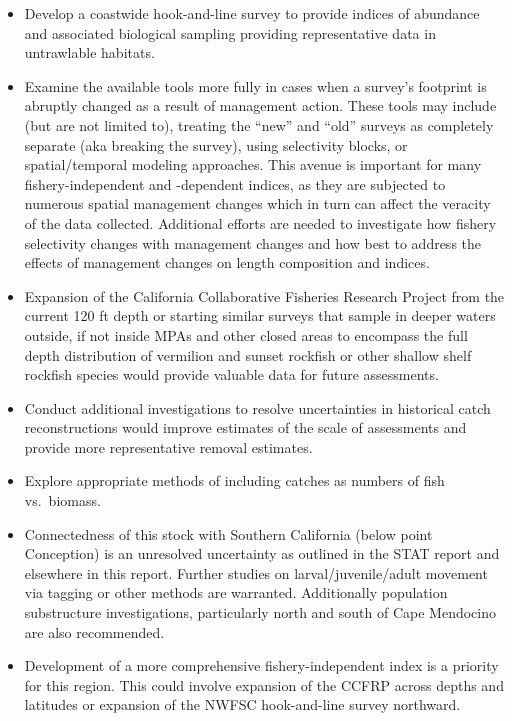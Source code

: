 \documentclass[
  english,
  a4paper,
]{article}
\begin{document}
\begin{itemize}
\item
  Develop a coastwide hook-and-line survey to provide indices of abundance and associated biological sampling providing representative data in untrawlable habitats.
\item
  Examine the available tools more fully in cases when a survey's footprint is abruptly changed as a result of management action. These tools may include (but are not limited to), treating the ``new'' and ``old'' surveys as completely separate (aka breaking the survey), using selectivity blocks, or spatial/temporal modeling approaches. This avenue is important for many fishery-independent and -dependent indices, as they are subjected to numerous spatial management changes which in turn can affect the veracity of the data collected. Additional efforts are needed to investigate how fishery selectivity changes with management changes and how best to address the effects of management changes on length composition and indices.
\item
  Expansion of the California Collaborative Fisheries Research Project from the current 120 ft depth or starting similar surveys that sample in deeper waters outside, if not inside MPAs and other closed areas to encompass the full depth distribution of vermilion and sunset rockfish or other shallow shelf rockfish species would provide valuable data for future assessments.
\item
  Conduct additional investigations to resolve uncertainties in historical catch reconstructions would improve estimates of the scale of assessments and provide more representative removal estimates.
\item
  Explore appropriate methods of including catches as numbers of fish vs.~biomass.
\item
  Connectedness of this stock with Southern California (below point Conception) is an unresolved uncertainty as outlined in the STAT report and elsewhere in this report. Further studies on larval/juvenile/adult movement via tagging or other methods are warranted. Additionally population substructure investigations, particularly north and south of Cape Mendocino are also recommended.
\item
  Development of a more comprehensive fishery-independent index is a priority for this region. This could involve expansion of the CCFRP across depths and latitudes or expansion of the NWFSC hook-and-line survey northward.
\end{itemize}
\end{document}
